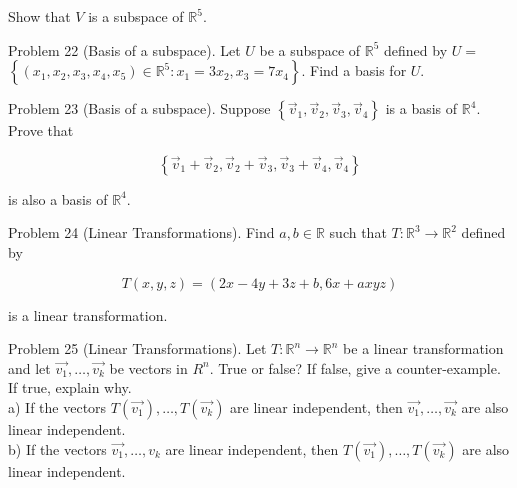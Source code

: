 \documentclass[10pt]{article}
\begin{document}
Show that $V$ is a subspace of $\mathbb{R}^{5}$.

Problem 22 (Basis of a subspace). Let $U$ be a subspace of $\mathbb{R}^{5}$ defined by $U=$ $\left\{\left(x_{1}, x_{2}, x_{3}, x_{4}, x_{5}\right) \in \mathbb{R}^{5}: x_{1}=3 x_{2}, x_{3}=7 x_{4}\right\}$. Find a basis for $U$.

Problem 23 (Basis of a subspace). Suppose $\left\{\vec{v}_{1}, \vec{v}_{2}, \vec{v}_{3}, \vec{v}_{4}\right\}$ is a basis of $\mathbb{R}^{4}$. Prove that

$$
\left\{\vec{v}_{1}+\vec{v}_{2}, \vec{v}_{2}+\vec{v}_{3}, \vec{v}_{3}+\vec{v}_{4}, \vec{v}_{4}\right\}
$$

is also a basis of $\mathbb{R}^{4}$.

Problem 24 (Linear Transformations). Find $a, b \in \mathbb{R}$ such that $T: \mathbb{R}^{3} \rightarrow \mathbb{R}^{2}$ defined by

$$
T(x, y, z)=(2 x-4 y+3 z+b, 6 x+a x y z)
$$

is a linear transformation.

Problem 25 (Linear Transformations). Let $T: \mathbb{R}^{n} \rightarrow \mathbb{R}^{n}$ be a linear transformation and let $\overrightarrow{v_{1}}, \ldots, \overrightarrow{v_{k}}$ be vectors in $R^{n}$. True or false? If false, give a counter-example. If true, explain why.\\
a) If the vectors $T\left(\overrightarrow{v_{1}}\right), \ldots, T\left(\overrightarrow{v_{k}}\right)$ are linear independent, then $\overrightarrow{v_{1}}, \ldots, \overrightarrow{v_{k}}$ are also linear independent.\\
b) If the vectors $\overrightarrow{v_{1}}, \ldots, v_{k}$ are linear independent, then $T\left(\overrightarrow{v_{1}}\right), \ldots, T\left(\overrightarrow{v_{k}}\right)$ are also linear independent.
\end{document}
